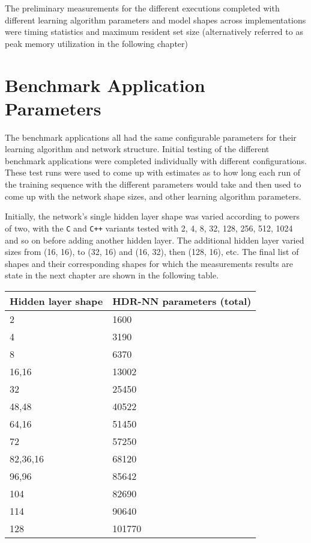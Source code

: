 The preliminary measurements for the different executions completed with different learning algorithm parameters and model shapes across implementations were timing statistics and maximum resident set size (alternatively referred to as peak memory utilization in the following chapter)

\section{Benchmark Application Parameters}

The benchmark applications all had the same configurable parameters for their learning algorithm and network structure. Initial testing of the different benchmark applications were completed individually with different configurations. These test runs were used to come up with estimates as to how long each run of the training sequence with the different parameters would take and then used to come up with the network shape sizes, and other learning algorithm parameters.

Initially, the network's single hidden layer shape was varied according to powers of two, with the \texttt{C} and \texttt{C++} variants tested with 2, 4, 8, 32, 128, 256, 512, 1024 and so on before adding another hidden layer. The additional hidden layer varied sizes from (16, 16), to (32, 16) and (16, 32), then (128, 16), etc. The final list of shapes and their corresponding shapes for which the measurements results are state in the next chapter are shown in the following table.

\begin{table}[ht]
	\centering
	\begin{tabular}{ |p{11em}|p{14em}| }
		\hline
			\textbf{Hidden layer shape} & \textbf{HDR-NN parameters} (total)\\
		\hline
			2 & 1600 \\
		\hline
			4 & 3190 \\
		\hline
			8 & 6370 \\
		\hline
			16,16 & 13002 \\
		\hline
			32 & 25450 \\
		\hline
			48,48 & 40522 \\
		\hline
			64,16 & 51450 \\
		\hline
			72 & 57250 \\
		\hline
			82,36,16 & 68120 \\
		\hline
			96,96 & 85642 \\
		\hline
			104 & 82690 \\
		\hline
			114 & 90640 \\
		\hline
			128 & 101770 \\
		\hline
	\end{tabular}
\end{table}

